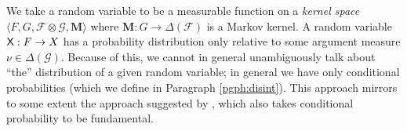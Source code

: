 







We take a random variable to be a measurable function on a \emph{kernel space} $\langle F, G, \mathcal{F}\otimes\mathcal{G},\mathbf{M}\rangle$ where $\mathbf{M}:G\to \Delta(\mathcal{F})$ is a Markov kernel. A random variable $\mathsf{X}:F\to X$ has a probability distribution only relative to some argument measure $\nu\in\Delta(\mathcal{G})$. Because of this, we cannot in general unambiguously talk about ``the'' distribution of a given random variable; in general we have only conditional probabilities (which we define in Paragraph \ref{pgph:disint}). This approach mirrors to some extent the approach suggested by \citet{hajek_what_2003}, which also takes conditional probability to be fundamental.


